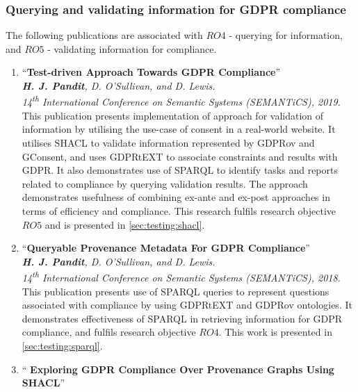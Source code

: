 \subsubsection{Querying and validating information for GDPR compliance}
The following publications are associated with $RO4$ - querying for information, and $RO5$ - validating information for compliance.
\begin{enumerate}[resume]
    \item ``\textbf{Test-driven Approach Towards GDPR Compliance}'' \cite{pandit_test-driven_2019} \\
    \textit{\textbf{H. J. Pandit}, D. O’Sullivan, and D. Lewis.} \\ 
    \textit{14\textsuperscript{th} International Conference on Semantic Systems (SEMANTiCS), 2019.}
        \vspace{0.1cm} \newline
         This publication presents implementation of approach for validation of information by utilising the use-case of consent in a real-world website. It utilises SHACL to validate information represented by GDPRov and GConsent, and uses GDPRtEXT to associate constraints and results with GDPR. It also demonstrates use of SPARQL to identify tasks and reports related to compliance by querying validation results. The approach demonstrates usefulness of combining ex-ante and ex-post approaches in terms of efficiency and compliance. This research fulfils research objective $RO5$ and is presented in \autoref{sec:testing:shacl}.
    \item ``\textbf{Queryable Provenance Metadata For GDPR Compliance}'' \cite{pandit_queryable_2018} \\
    \textit{\textbf{H. J. Pandit}, D. O’Sullivan, and D. Lewis.} \\ 
    \textit{14\textsuperscript{th} International Conference on Semantic Systems (SEMANTiCS), 2018.}
        \vspace{0.1cm} \newline
        This publication presents use of SPARQL queries to represent questions associated with compliance by using GDPRtEXT and GDPRov ontologies.
        It demonstrates effectiveness of SPARQL in retrieving information for GDPR compliance, and fulfils research objective $RO4$. This work is presented in \autoref{sec:testing:sparql}.
    \item ``\textbf{ Exploring GDPR Compliance Over Provenance Graphs Using SHACL}'' \cite{pandit_exploring_2018} \\

\end{enumerate}
